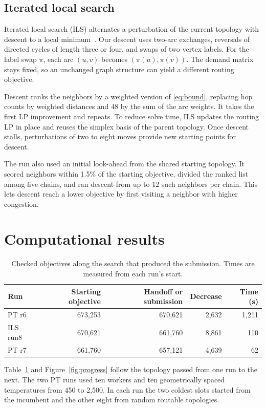 \documentclass[a4paper]{article}
\begin{document}
\subsection{Iterated local search}

Iterated local search (ILS) alternates a perturbation of the current topology with descent to a local minimum~\cite{lourenco}.
Our descent uses two-arc exchanges, reversals of directed cycles of length three or four, and swaps of two vertex labels.
For the label swap \(\pi\), each arc \((u,v)\) becomes \((\pi(u),\pi(v))\). The demand matrix stays fixed, so an unchanged
graph structure can yield a different routing objective.

Descent ranks the neighbors by a weighted version of \eqref{eq:bound}, replacing hop counts by weighted distances and
48 by the sum of the arc weights. It takes the first LP improvement and repeats.
To reduce solve time, ILS updates the routing LP in place and reuses the simplex basis of the parent topology.
Once descent stalls, perturbations of two to eight moves provide new starting points for descent.

The run also used an initial look-ahead from the shared starting topology. It scored neighbors within 1.5\% of the
starting objective, divided the ranked list among five chains, and ran descent from up to 12 such neighbors per chain.
This lets descent reach a lower objective by first visiting a neighbor with higher congestion.

\section{Computational results}

\begin{table}[htbp]
\centering
\caption{Checked objectives along the search that produced the submission. Times are measured from each run's start.}
\label{tab:runs}
\begin{tabular}{@{}lrrrr@{}}
\toprule
Run & Starting objective & Handoff or submission & Decrease & Time (s)\\
\midrule
PT r6    & 673,253 & 670,621 & 2,632 & 1,211\\
ILS run8 & 670,621 & 661,760 & 8,861 &   110\\
PT r7    & 661,760 & 657,121 & 4,639 &    62\\
\bottomrule
\end{tabular}
\end{table}

Table~\ref{tab:runs} and Figure~\ref{fig:progress} follow the topology passed from one run to the next.
The two PT runs used ten workers and ten geometrically spaced temperatures from 450 to 2,500. In each run the two
coldest slots started from the incumbent and the other eight from random routable topologies.
\end{document}

